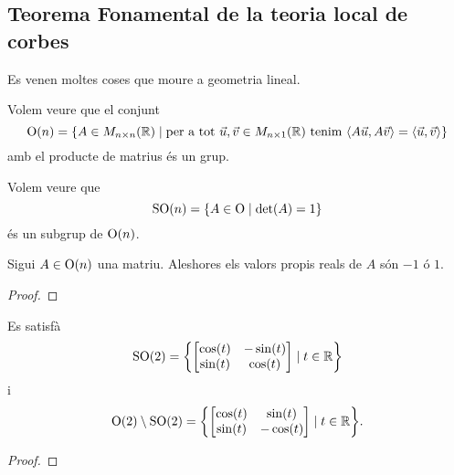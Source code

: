 \documentclass[../Apunts.tex]{subfiles}
\begin{document}
	\subsection{Teorema Fonamental de la teoria local de corbes}
	\begin{note} %
		Es venen moltes coses que moure a geometria lineal.
	\end{note}
	\begin{example}
		\label{ex:grup ortogonal}
		Volem veure que el conjunt
		\[\GrupOrtogonal(n)=\{A\in\matrius_{n\times n}(\mathbb{R})\mid\text{per a tot }\vec{u},\vec{v}\in\matrius_{n\times1}(\mathbb{R})\text{ tenim }\prodesc{A\vec{u}}{A\vec{v}}=\prodesc{\vec{u}}{\vec{v}}\}\]
		amb el producte de matrius és un grup.
		\begin{solution}
		\end{solution}
	\end{example}
	\begin{example}
		\label{ex:grup especial ortogonal}
		Volem veure que
		\[\mathrm{SO}(n)=\{A\in\mathrm{O}\mid\det(A)=1\}\]
		és un subgrup de \(\mathrm{O}(n)\).
		\begin{solution}
		\end{solution}
	\end{example}
	\begin{proposition}
		\label{prop:els valors propis d'una matriu ortogonal són -1 o 1}
		Sigui \(A\in\mathrm{O}(n)\) una matriu. Aleshores els valors propis reals de \(A\) són \(-1\) ó \(1\).
		\begin{proof}
		\end{proof}
	\end{proposition}
	\begin{proposition}
		\label{prop:caracterització de les matrius ortogonals 2x2}
		Es satisfà
		\[\GrupEspecialOrtogonal(2)=\left\{\begin{bmatrix}
			\cos(t) & -\sin(t) \\
			\sin(t) & \cos(t)
		\end{bmatrix}\mid t\in\mathbb{R}\right\}\]
		i
		\[\GrupOrtogonal(2)\setminus\GrupEspecialOrtogonal(2)=\left\{\begin{bmatrix}
			\cos(t) & \sin(t) \\
			\sin(t) & -\cos(t)
		\end{bmatrix}\mid t\in\mathbb{R}\right\}.\]
		\begin{proof}
		\end{proof}
	\end{proposition}
\end{document}
